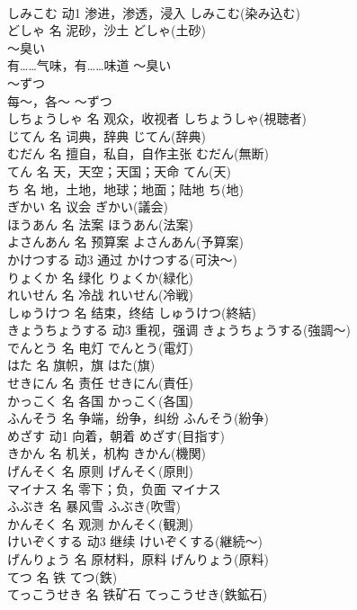 \documentclass[8pt]{extreport}
\begin{document}
\begin{CJK}{UTF8}{min}
\\	しみこむ	动1	渗进，渗透，浸入	しみこむ(染み込む)	
\\	どしゃ	名	泥砂，沙土	どしゃ(土砂)	
\\	～臭い	
\\	有……气味，有……味道	～臭い	
\\	～ずつ	
\\	每～，各～	～ずつ	
\\	しちょうしゃ	名	观众，收视者	しちょうしゃ(視聴者)	
\\	じてん	名	词典，辞典	じてん(辞典)	
\\	むだん	名	擅自，私自，自作主张	むだん(無断)	
\\	てん	名	天，天空；天国；天命	てん(天)	
\\	ち	名	地，土地，地球；地面；陆地	ち(地)	
\\	ぎかい	名	议会	ぎかい(議会)	
\\	ほうあん	名	法案	ほうあん(法案)	
\\	よさんあん	名	预算案	よさんあん(予算案)	
\\	かけつする	动3	通过	かけつする(可決～)	
\\	りょくか	名	绿化	りょくか(緑化)	
\\	れいせん	名	冷战	れいせん(冷戦)	
\\	しゅうけつ	名	结束，终结	しゅうけつ(終結)	
\\	きょうちょうする	动3	重视，强调	きょうちょうする(強調～)	
\\	でんとう	名	电灯	でんとう(電灯)	
\\	はた	名	旗帜，旗	はた(旗)	
\\	せきにん	名	责任	せきにん(責任)	
\\	かっこく	名	各国	かっこく(各国)	
\\	ふんそう	名	争端，纷争，纠纷	ふんそう(紛争)	
\\	めざす	动1	向着，朝着	めざす(目指す)	
\\	きかん	名	机关，机构	きかん(機関)	
\\	げんそく	名	原则	げんそく(原則)	
\\	マイナス	名	零下；负，负面	マイナス	
\\	ふぶき	名	暴风雪	ふぶき(吹雪)	
\\	かんそく	名	观测	かんそく(観測)	
\\	けいぞくする	动3	继续	けいぞくする(継続～)	
\\	げんりょう	名	原材料，原料	げんりょう(原料)	
\\	てつ	名	铁	てつ(鉄)	
\\	てっこうせき	名	铁矿石	てっこうせき(鉄鉱石)	

\end{CJK}
\end{document}
